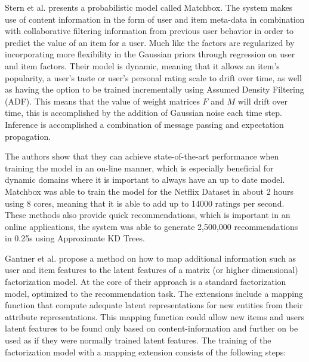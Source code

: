 
Stern et al. \cite{Stern2009} presents a probabilistic model called Matchbox.
The system makes use of content information in the form of user and item
meta-data in combination with collaborative filtering information from previous
user behavior in order to predict the value of an item for a user. Much like
\cite{Agarwal2009} the factors are regularized by incorporating more
flexibility in the Gaussian priors through regression on user and item factors.
Their model is dynamic, meaning that it allows an item's popularity, a user's
taste or user's personal rating scale to drift over time, as well as having the
option to be trained incrementally using Assumed Density Filtering (ADF). This
means that the value of weight matrices $F$ and $M$ will drift over time, this
is accomplished by the addition of Gaussian noise each time step. Inference is
accomplished a combination of message passing and expectation propagation.

The authors show that they can achieve state-of-the-art performance when
training the model in an on-line manner, which is especially beneficial for
dynamic domains where it is important to always have an up to date model.
Matchbox was able to train the model for the Netflix Dataset in about 2 hours
using 8 cores, meaning that it is able to add up to 14000 ratings per second.
These methods also provide quick recommendations, which is important in an
online applications, the system was able to generate 2,500,000 recommendations
in 0.25s using Approximate KD Trees.


Gantner et al. \cite{Gantner2010} propose a method on how to map additional
information such as user and item features to the latent features of a matrix
(or higher dimensional) factorization model. At the core of their approach is a
standard factorization model, optimized to the recommendation task. The
extensions include a mapping function that compute adequate latent
representations for new entities from their attribute representations. This
mapping function could allow new items and users latent features to be found
only based on content-information and further on be used as if they were
normally trained latent features. The training of the factorization model with
a mapping extension consists of the following steps:

